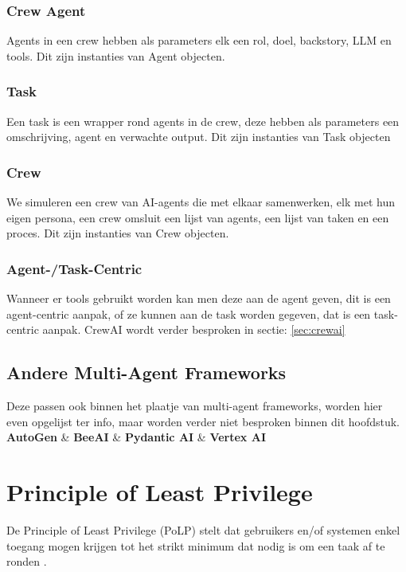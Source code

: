 \subsubsection{Crew Agent}
\label{sssec:crewagent}
Agents in een crew hebben als parameters elk een rol, doel, backstory, LLM en tools. Dit zijn instanties van Agent objecten.
\subsubsection{Task}
\label{sssec:task}
Een task is een wrapper rond agents in de crew, deze hebben als parameters een omschrijving, agent en verwachte output.  Dit zijn instanties van Task objecten
\subsubsection{Crew}
\label{sssec:crew}
We simuleren een crew van AI-agents die met elkaar samenwerken, elk met hun eigen persona, een crew omsluit een lijst van agents, een lijst van taken en een proces. Dit zijn instanties van Crew objecten.

\subsubsection{Agent-/Task-Centric}
\label{sssec:agentortaskcentric}
Wanneer er tools gebruikt worden kan men deze aan de agent geven, dit is een agent-centric aanpak, of ze kunnen aan de task worden gegeven, dat is een task-centric aanpak. CrewAI wordt verder besproken in sectie: \ref{sec:crewai}

\subsection{Andere Multi-Agent Frameworks}
\label{ssec:anderemultiagentframeworks}
Deze passen ook binnen het plaatje van multi-agent frameworks, worden hier even opgelijst ter info, maar worden verder niet besproken binnen dit hoofdstuk. \\

\textbf{AutoGen} \& \textbf{BeeAI} \& \textbf{Pydantic AI} \& \textbf{Vertex AI}

\section{Principle of Least Privilege}
\label{sec:principleofleastprivilege}
De Principle of Least Privilege (PoLP) stelt dat gebruikers en/of systemen enkel toegang mogen krijgen tot het strikt minimum dat nodig is om een taak af te ronden \autocite{NIST}. \\

